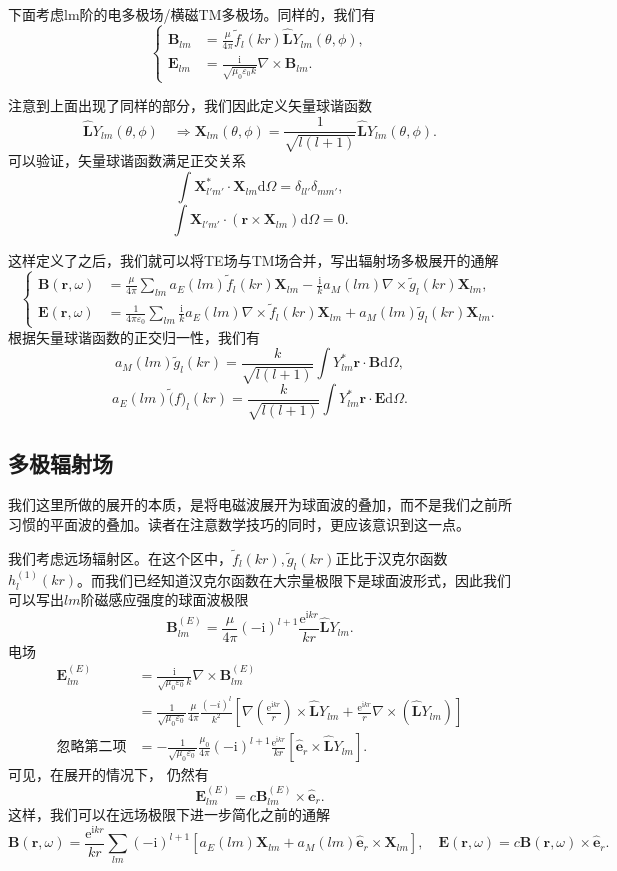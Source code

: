 \documentclass[UTF8]{ctexbook}
\newcommand{\e}{\mathrm{e}}
\renewcommand{\d}{\mathrm{d}}
\renewcommand{\b}{\boldsymbol}
\renewcommand{\i}{\mathrm{i}}
\renewcommand{\k}{\frac{1}{4\pi\varepsilon_0}}
\numberwithin{equation}{chapter}
\begin{document}
	下面考虑lm阶的电多极场/横磁TM多极场。同样的，我们有
	\[\left\{\begin{aligned}
		\b{B}_{lm}&=\frac{\mu}{4\pi}\tilde{f}_l(kr)\hat{\b{L}}Y_{lm}(\theta,\phi), \\
		\b{E}_{lm}&=\frac{\i}{\sqrt{\mu_0\varepsilon_0 k}}\nabla\times\b{B}_{lm}.
	\end{aligned}
	\right.\]
	
	注意到上面出现了同样的部分，我们因此定义矢量球谐函数
	\[\hat{\b{L}}Y_{lm}(\theta,\phi)\quad \Rightarrow \b{X}_{lm}(\theta,\phi)=\frac{1}{\sqrt{l(l+1)}}\hat{\b{L}}Y_{lm}(\theta,\phi).\]
	可以验证，矢量球谐函数满足正交关系
	\[\int \b{X}_{l'm'}^*\cdot\b{X}_{lm}\d \Omega=\delta_{ll'}\delta_{mm'},\]
	\[\int \b{X}_{l'm'}\cdot(\b{r}\times\b{X}_{lm})\d \Omega=0.\]
	
	这样定义了之后，我们就可以将TE场与TM场合并，写出辐射场多极展开的通解
	\[\left\{\begin{aligned}
		\b{B}(\b{r},\omega)&=\frac{\mu}{4\pi}\sum_{lm} a_E(lm)\tilde{f}_l(kr)\b{X}_{lm}-\frac{\i}{k}a_M(lm)\nabla\times\tilde{g}_l(kr)\b{X}_{lm},\\
		\b{E}(\b{r},\omega)&=\k\sum_{lm}\frac{\i}{k}a_E(lm)\nabla\times\tilde{f}_l(kr)\b{X}_{lm}+a_M(lm)\tilde{g}_{l}(kr)\b{X}_{lm}.
	\end{aligned}
	\right.\]
	根据矢量球谐函数的正交归一性，我们有
	\[a_M(lm)\tilde{g}_l(kr)=\frac{k}{\sqrt{l(l+1)}}\int Y_{lm}^*\b{r}\cdot\b{B}\d \Omega,\]
	\[a_E(lm)\tilde(f)_l(kr)=\frac{k}{\sqrt{l(l+1)}}\int Y_{lm}^*\b{r}\cdot\b{E}\d \Omega.\]
	
	\subsection{多极辐射场}
	我们这里所做的展开的本质，是将电磁波展开为球面波的叠加，而不是我们之前所习惯的平面波的叠加。读者在注意数学技巧的同时，更应该意识到这一点。
	
	我们考虑远场辐射区。在这个区中，$\tilde{f}_l(kr),\tilde{g}_l(kr)$正比于汉克尔函数$h_l^{(1)}(kr)$。而我们已经知道汉克尔函数在大宗量极限下是球面波形式，因此我们可以写出$lm$阶磁感应强度的球面波极限
	\[\b{B}_{lm}^{(E)}=\frac{\mu}{4\pi}(-\i)^{l+1}\frac{\e^{\i kr}}{kr}\hat{\b{L}}Y_{lm}.\]
	电场
	\begin{align*}
		\b{E}_{lm}^{(E)}&=\frac{\i}{\sqrt{\mu_0\varepsilon_0}k}\nabla\times\b{B}_{lm}^{(E)} \\
		&=\frac{1}{\sqrt{\mu_0\varepsilon_0}}\frac{\mu}{4\pi}\frac{(-i)^l}{k^2}\left[\nabla\left(\frac{\e^{\i kr}}{r}\right)\times\hat{\b{L}}Y_{lm}+\frac{\e^{\i kr}}{r}\nabla\times(\hat{\b{L}}Y_{lm})\right] \\
		\text{忽略第二项} &=-\frac{1}{\sqrt{\mu_0\varepsilon_0}}\frac{\mu_0}{4\pi}(-\i)^{l+1}\frac{\e^{\i kr}}{kr}\left[\hat{\b{e}}_r\times\hat{\b{L}}Y_{lm}\right].
	\end{align*}
	可见，在展开的情况下， 仍然有
	\[\b{E}_{lm}^{(E)}=c\b{B}_{lm}^{(E)}\times\hat{\b{e}}_r.\]
	这样，我们可以在远场极限下进一步简化之前的通解
	\[\b{B}(\b{r},\omega)=\frac{\e^{\i kr}}{kr}\sum_{lm}(-\i)^{l+1}\left[a_E(lm)\b{X}_{lm}+a_M(lm)\hat{\b{e}}_r\times\b{X}_{lm}\right],\quad \b{E}(\b{r},\omega)=c\b{B}(\b{r},\omega)\times\hat{\b{e}}_r.\]
	
\end{document}
